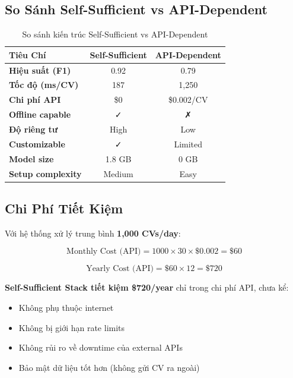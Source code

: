 \subsection{So Sánh Self-Sufficient vs API-Dependent}

\begin{table}[h]
\centering
\caption{So sánh kiến trúc Self-Sufficient vs API-Dependent}
\label{tab:architecture_comparison}
\begin{tabular}{lcc}
\hline
\textbf{Tiêu Chí} & \textbf{Self-Sufficient} & \textbf{API-Dependent} \\
\hline
\textbf{Hiệu suất (F1)} & 0.92 & 0.79 \\
\textbf{Tốc độ (ms/CV)} & 187 & 1,250 \\
\textbf{Chi phí API} & \$0 & \$0.002/CV \\
\textbf{Offline capable} & ✓ & ✗ \\
\textbf{Độ riêng tư} & High & Low \\
\textbf{Customizable} & ✓ & Limited \\
\textbf{Model size} & 1.8 GB & 0 GB \\
\textbf{Setup complexity} & Medium & Easy \\
\hline
\end{tabular}
\end{table}

\subsection{Chi Phí Tiết Kiệm}

Với hệ thống xử lý trung bình \textbf{1,000 CVs/day}:

\begin{equation}
\text{Monthly Cost (API)} = 1000 \times 30 \times \$0.002 = \$60
\end{equation}

\begin{equation}
\text{Yearly Cost (API)} = \$60 \times 12 = \$720
\end{equation}

\textbf{Self-Sufficient Stack tiết kiệm \$720/year} chỉ trong chi phí API, chưa kể:
\begin{itemize}
    \item Không phụ thuộc internet
    \item Không bị giới hạn rate limits
    \item Không rủi ro về downtime của external APIs
    \item Bảo mật dữ liệu tốt hơn (không gửi CV ra ngoài)
\end{itemize}

